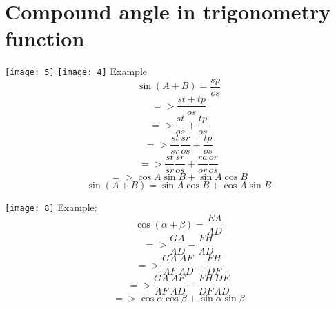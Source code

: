 \section{Compound angle in trigonometry function}
\texttt{[image: 5]}
\texttt{[image: 4]}
\newline
Example
\begin{equation}
\sin(A+B)=\frac{sp}{os}
\end{equation}
\begin{displaymath}
=>\frac{st+tp}{os}
\end{displaymath}
\begin{displaymath}
=>\frac{st}{os}+\frac{tp}{os}
\end{displaymath}
\begin{displaymath}
=>\frac{st}{sr}\frac{sr}{os}+\frac{tp}{os}
\end{displaymath}
\begin{displaymath}
=>\frac{st}{sr}\frac{sr}{os}+\frac{ra}{or}\frac{or}{os}
\end{displaymath}
\begin{displaymath}
=> \cos A\sin B+\sin A\cos B
\end{displaymath}
\begin{equation}
\sin(A+B) = \sin A\cos B+\cos A\sin B
\end{equation}

\texttt{[image: 8]}
\newline
Example:
\newline
\begin{displaymath}
\cos(\alpha+\beta) = \frac{EA}{AD}
\end{displaymath}
\begin{displaymath}
=> \frac{GA}{AD}-\frac{FH}{AD}
\end{displaymath}
\begin{displaymath}
=> \frac{GA}{AF}\frac{AF}{AD}-\frac{FH}{DF}
\end{displaymath}
\begin{displaymath}
=> \frac{GA}{AF}\frac{AF}{AD}-\frac{FH}{DF}\frac{DF}{AD}
\end{displaymath}
\begin{equation}
=> \cos\alpha \cos\beta + \sin\alpha \sin\beta
\end{equation}

